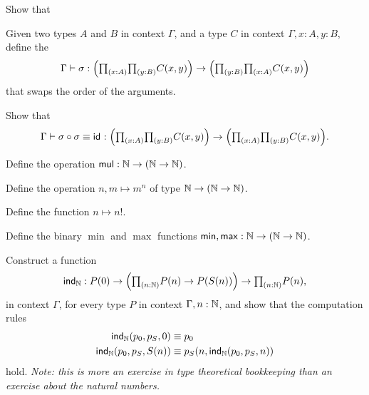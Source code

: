 \begin{exercises}
\begin{subexenum}
\begin{prooftree}
\end{prooftree}
\item Show that
\begin{prooftree}
\end{prooftree}
\end{subexenum}
\item \label{ex:swap}
\begin{subexenum}
\item Given two types $A$ and $B$ in context $\Gamma$, and a type $C$ in context $\Gamma,x:A,y:B$, define the 
\begin{equation*}
\Gamma\vdash \sigma:\Big(\prd{x:A}{y:B}C(x,y)\Big)\to\Big(\prd{y:B}{x:A}C(x,y)\Big)
\end{equation*}
that swaps the order of the arguments.
\item Show that
\begin{equation*}
\Gamma\vdash \sigma\circ\sigma\jdeq\idfunc:\Big(\prd{x:A}{y:B}C(x,y)\Big)\to \Big(\prd{x:A}{y:B}C(x,y)\Big).
\end{equation*}
\end{subexenum}
\item 
\begin{subexenum}
\item Define the  operation $\mathsf{mul}:\N\to(\N\to\N)$.
\item Define the  operation $n,m\mapsto m^n$ of type $\N\to (\N\to \N)$.
\item Define the  function $n\mapsto n!$. 
\end{subexenum}
\item Define the binary $\min$ and $\max$ functions $\mathsf{min},\mathsf{max}:\N\to(\N\to\N)$.
\item Construct a function
\begin{equation*}
\ind{\nat}:P(0)\to \Big(\prd{n:\nat}P(n)\to P(S(n))\Big)\to \prd{n:\nat}P(n),
\end{equation*}
in context $\Gamma$, for every type $P$ in context $\Gamma,n:\N$, and show that the computation rules
\begin{align*}
\ind{\nat}(p_0,p_S,0) & \jdeq p_0 \\
\ind{\nat}(p_0,p_S,S(n)) & \jdeq p_S(n,\ind{\nat}(p_0,p_S,n))
\end{align*}
hold. \emph{Note: this is more an exercise in type theoretical bookkeeping than an exercise about the natural numbers.}
\end{exercises}
